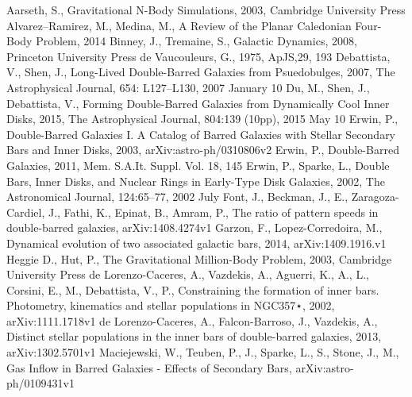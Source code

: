 \documentclass[a4paper,12pt]{article}
\begin{document}
\newpage
\begin{thebibliography}{1}
Aarseth, S., Gravitational N-Body Simulations, 2003, Cambridge University Press
Alvarez–Ramirez, M., Medina, M., A Review of the Planar Caledonian Four-Body Problem, 2014
Binney, J., Tremaine, S., Galactic Dynamics, 2008, Princeton University Press
de Vaucouleurs, G., 1975, ApJS,29, 193
Debattista, V., Shen, J., Long-Lived Double-Barred Galaxies from Psuedobulges, 2007, The Astrophysical Journal, 654: L127–L130, 2007 January 10
Du, M., Shen, J., Debattista, V., Forming Double-Barred Galaxies from Dynamically Cool Inner Disks, 2015, The Astrophysical Journal, 804:139 (10pp), 2015 May 10 
Erwin, P., Double-Barred Galaxies I. A Catalog of Barred Galaxies with Stellar Secondary Bars and Inner Disks, 2003, arXiv:astro-ph/0310806v2
Erwin, P., Double-Barred Galaxies, 2011, Mem. S.A.It. Suppl. Vol. 18, 145
Erwin, P., Sparke, L., Double Bars, Inner Disks, and Nuclear Rings in Early-Type Disk Galaxies, 2002, The Astronomical Journal, 124:65–77, 2002 July
Font, J., Beckman, J., E., Zaragoza-Cardiel, J., Fathi, K., Epinat, B., Amram, P., The ratio of pattern speeds in double-barred galaxies, arXiv:1408.4274v1
Garzon, F., Lopez-Corredoira, M., Dynamical evolution of two associated galactic bars, 2014, arXiv:1409.1916.v1
Heggie D., Hut, P., The Gravitational Million-Body Problem, 2003, Cambridge University Press
de Lorenzo-Caceres, A., Vazdekis, A., Aguerri, K., A., L., Corsini, E., M., Debattista, V., P., Constraining the formation of inner bars. Photometry, kinematics and stellar populations in NGC357⋆, 2002, arXiv:1111.1718v1
de Lorenzo-Caceres, A., Falcon-Barroso, J., Vazdekis, A., Distinct stellar populations in the inner bars of double-barred galaxies, 2013, arXiv:1302.5701v1
Maciejewski, W., Teuben, P., J., Sparke, L., S., Stone, J., M., Gas Inflow in Barred Galaxies - Effects of Secondary Bars, arXiv:astro-ph/0109431v1

\end{thebibliography}
\end{document}
